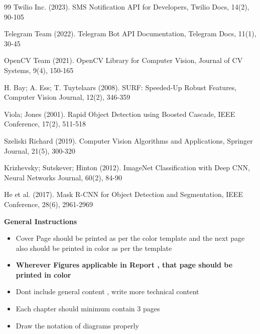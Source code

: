 \documentclass[10pt,openany]{report}
\begin{document}
\begin{sloppypar}
{{{\begin{sloppypar}
\begin{thebibliography}{99}
\bibitem{} Twilio Inc. (2023). SMS Notification API for Developers, Twilio Docs, 14(2), 90-105

\bibitem{} Telegram Team (2022). Telegram Bot API Documentation, Telegram Docs, 11(1), 30-45

\bibitem{} OpenCV Team (2021). OpenCV Library for Computer Vision, Journal of CV Systems, 9(4), 150-165

\bibitem{} H. Bay; A. Ess; T. Tuytelaars (2008). SURF: Speeded-Up Robust Features, Computer Vision Journal, 12(2), 346-359

\bibitem{} Viola; Jones (2001). Rapid Object Detection using Boosted Cascade, IEEE Conference, 17(2), 511-518

\bibitem{} Szeliski Richard (2019). Computer Vision Algorithms and Applications, Springer Journal, 21(5), 300-320

\bibitem{} Krizhevsky; Sutskever; Hinton (2012). ImageNet Classification with Deep CNN, Neural Networks Journal, 60(2), 84-90

\bibitem{} He et al. (2017). Mask R-CNN for Object Detection and Segmentation, IEEE Conference, 28(6), 2961-2969

\end{thebibliography}
\newpage

\begin{center} \textbf{General Instructions} \end{center} 
\begin{itemize}
\item Cover Page should be printed as per the color template and the next page also should be printed in color as per the template
\item \textbf {Wherever Figures applicable in Report , that page should be printed in color}
\item Dont include general content , write more technical content


\item Each chapter should minimum contain 3 pages
\item Draw the notation of diagrams properly 


\end{itemize}
\end{sloppypar}}}}
\end{sloppypar}
\end{document}
